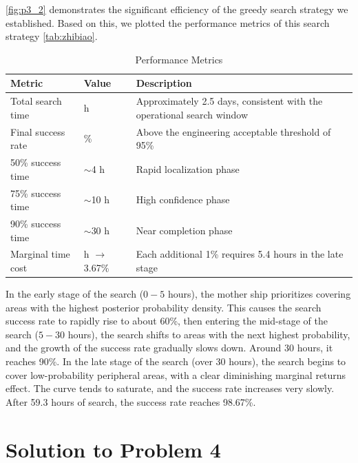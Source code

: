 \documentclass{mcmthesis}
\begin{document}
\autoref{fig:p3_2} demonstrates the significant efficiency of the greedy search strategy we established.
Based on this, we plotted the performance metrics of this search strategy \autoref{tab:zhibiao}.
\begin{table}[ht]
    \centering
  \small
  \setlength{\tabcolsep}{6pt}
  \renewcommand{\arraystretch}{1.15}
  \vspace{-0.2cm}
  \caption{Performance Metrics}
  \vspace{-0.4cm}
    \label{tab:zhibiao}
  \begin{tabularx}{\linewidth}{@{}l >{\centering\arraybackslash}p{2.6cm} >{\raggedright\arraybackslash}X@{}}
        \toprule
    \textbf{Metric} & \textbf{Value} & \textbf{Description} \\
        \midrule
    Total search time & 59.3 h & Approximately 2.5 days, consistent with the operational search window \\
    Final success rate & 98.67\% & Above the engineering acceptable threshold of 95\% \\
    50\% success time & $\sim$4 h & Rapid localization phase \\
    75\% success time & $\sim$10 h & High confidence phase \\
    90\% success time & $\sim$30 h & Near completion phase \\
    Marginal time cost & 20 h $\rightarrow$ 3.67\% & Each additional 1\% requires 5.4 hours in the late stage \\
        \bottomrule
  \end{tabularx}
\end{table}

In the early stage of the search ($0-5$ hours), the mother ship prioritizes covering areas with the highest posterior probability density.
This causes the search success rate to rapidly rise to about 60\%,
then entering the mid-stage of the search ($5-30$ hours), the search shifts to areas with the next highest probability, and the growth of the success rate gradually slows down.
Around 30 hours, it reaches 90\%.
In the late stage of the search (over 30 hours), the search begins to cover low-probability peripheral areas, with a clear diminishing marginal returns effect.
The curve tends to saturate, and the success rate increases very slowly. After 59.3 hours of search, the success rate reaches 98.67\%.

\section{Solution to Problem 4}
\end{document}
